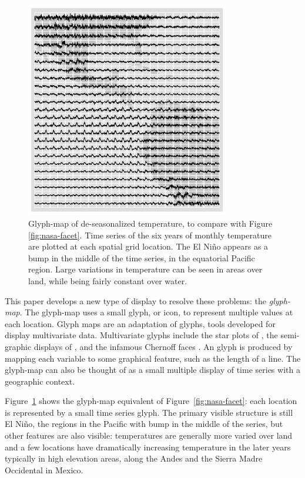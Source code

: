 \documentclass[oneside]{article}
\begin{document}
\begin{figure}[htbp]
  \centering
  \includegraphics[width=3.5in]{nasa-deseas-glyph}
  \caption{Glyph-map of de-seasonalized temperature, to compare with Figure \ref{fig:nasa-facet}. Time series of the six years of monthly temperature are plotted at each spatial grid location. The El Ni\~no appears as a bump in the middle of the time series, in the equatorial Pacific region. Large variations in temperature can be seen in areas over land, while being fairly constant over water. }
  \label{fig:nasa-glyph}
\end{figure}


This paper develops a new type of display to resolve these problems: the \emph{glyph-map}. The glyph-map uses a small glyph, or icon, to represent multiple values at each location. Glyph maps are an adaptation of glyphs, tools developed for display multivariate data. Multivariate glyphs include the star plots of \citet{mayr:1877}, the semi-graphic displays of \citet{anderson:1960}, and the infamous Chernoff faces \citep{chernoff:1973}. An glyph is produced by mapping each variable to some graphical feature, such as the length of a line. The glyph-map can also be thought of as a small multiple display \citet{tufte:2001} of time series with a geographic context.

Figure~\ref{fig:nasa-glyph} shows the glyph-map equivalent of Figure~\ref{fig:nasa-facet}: each location is represented by a small time series glyph. The primary visible structure is still El Ni\~no, the regions in the Pacific with bump in the middle of the series, but other features are also visible: temperatures are generally more varied over land and a few locations have dramatically increasing temperature in the later years typically in high elevation areas, along the Andes and the Sierra Madre Occidental in Mexico.
\end{document}
